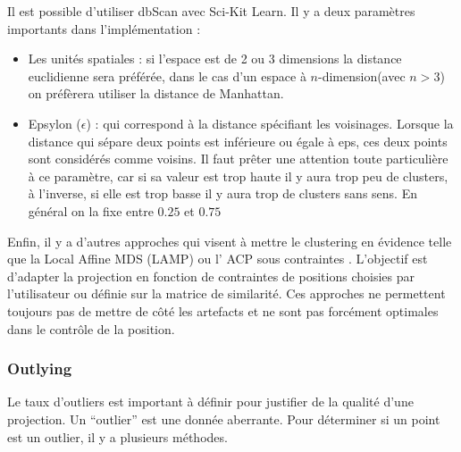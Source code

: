 Il est possible d’utiliser dbScan avec Sci-Kit Learn\cite{towardsdatascience-DBSCAN2}. Il y a deux paramètres importants dans l'implémentation :
\begin{itemize}
    \item Les unités spatiales : si l’espace est de 2 ou 3 dimensions la distance euclidienne sera préférée, dans le cas d’un espace à $n$-dimension(avec $n>3$) on préfèrera utiliser la distance de Manhattan.
    \item Epsylon ($\epsilon$) : qui correspond à la distance spécifiant les voisinages. Lorsque la distance qui sépare deux points est inférieure ou égale à eps, ces deux points sont considérés comme voisins. 
    Il faut prêter une attention toute particulière à ce paramètre, car si sa valeur est trop haute il y aura trop peu de clusters, à l’inverse, si elle est trop basse il y aura trop de clusters sans sens. En général on la fixe entre $0.25$ et $0.75$
\end{itemize}

\medskip
Enfin, il y a d’autres approches qui visent à mettre le clustering en évidence telle que la
Local Affine MDS (LAMP) \cite{joia2011local-LAMP} ou l’ ACP sous contraintes . L’objectif est d’adapter la projection
en fonction de contraintes de positions choisies par l'utilisateur ou définie sur la matrice de
similarité. Ces approches ne permettent toujours pas de mettre de côté les artefacts et ne
sont pas forcément optimales dans le contrôle de la position.

\subsubsection{Outlying}

Le taux d’outliers est important à définir pour justifier de la qualité d’une projection.
Un “outlier” est une donnée aberrante. Pour déterminer si un point est un outlier, il y a plusieurs méthodes.

